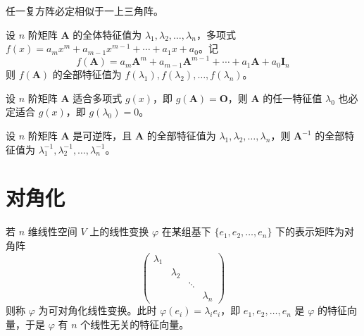 \begin{theorem}
    任一复方阵必定相似于一上三角阵。
\end{theorem}

\begin{proposition}
    设 $n$ 阶矩阵 $\bm{A}$ 的全体特征值为 $\lambda_1, \lambda_2, \ldots, \lambda_n$，多项式 $f(x) = a_{m}x^{m} + a_{m - 1}x^{m - 1} + \cdots +a_{1}x + a_{0}$。记
    \[f(\bm{A}) = a_{m}\bm{A}^{m} + a_{m - 1}\bm{A}^{m - 1} + \cdots +a_{1}\bm{A} + a_{0}\bm{I}_n\]
    则 $f(\bm{A})$ 的全部特征值为 $f(\lambda_1), f(\lambda_2), \ldots, f(\lambda_n)$。
\end{proposition}

\begin{proposition}
    设 $n$ 阶矩阵 $\bm{A}$ 适合多项式 $g(x)$，即 $g(\bm{A}) = \bm{O}$，则 $\bm{A}$ 的任一特征值 $\lambda_0$ 也必定适合 $g(x)$，即 $g(\lambda_0) = 0$。
\end{proposition}

\begin{proposition}
    设 $n$ 阶矩阵 $\bm{A}$ 是可逆阵，且 $\bm{A}$ 的全部特征值为 $\lambda_1, \lambda_2, \ldots , \lambda_n$，则 $\bm{A}^{-1}$ 的全部特征值为 $\lambda_{1}^{-1}, \lambda_{2}^{-1}, \ldots ,\lambda_{n}^{-1}$。
\end{proposition}






\section{对角化}

\begin{definition}
    若 $n$ 维线性空间 $V$ 上的线性变换 $\varphi$ 在某组基下 $\{e_1, e_2, \ldots , e_n\}$ 下的表示矩阵为对角阵
    \[
        \begin{pmatrix}
            \lambda_1 & \         & \      & \         \\
            \         & \lambda_2 & \      & \         \\
            \         & \         & \ddots & \         \\
            \         & \         & \      & \lambda_n
        \end{pmatrix}
    \]
    则称 $\varphi$ 为可对角化线性变换。此时 $\varphi(e_{i}) = \lambda_{i}e_{i}$，即 $e_1, e_2, \ldots , e_n$ 是 $\varphi$ 的特征向量，于是 $\varphi$ 有 $n$ 个线性无关的特征向量。
\end{definition}

